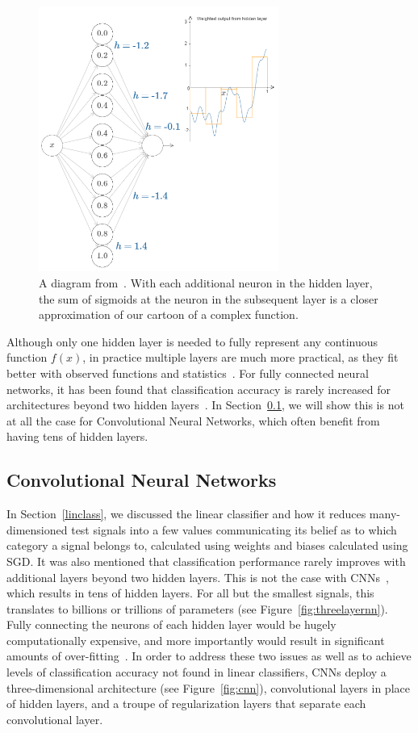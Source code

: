 \begin{figure}[ht!]
	\centering	\includegraphics[width=0.7\textwidth,keepaspectratio]{figs/functionapprox.png}
    \caption{A diagram from~\cite{universalapproxarticle}. With each additional neuron in the hidden layer, the sum of sigmoids at the neuron in the subsequent layer is a closer approximation of our cartoon of a complex function.}
\label{fig:functionapprox}      
\end{figure}

Although only one hidden layer is needed to fully represent any continuous function $f(x)$, in practice multiple layers are much more practical, as they fit better with observed functions and statistics~\cite{cs231}. For fully connected neural networks, it has been found that classification accuracy is rarely increased for architectures beyond two hidden layers~\cite{cs231}. In Section~\ref{cnn}, we will show this is not at all the case for Convolutional Neural Networks, which often benefit from having tens of hidden layers.

\subsection{Convolutional Neural Networks}
\label{cnn}
In Section~\ref{linclass}, we discussed the linear classifier and how it reduces many-dimensioned test signals into a few values communicating its belief as to which category a signal belongs to, calculated using weights and biases calculated using SGD. It was also mentioned that classification performance rarely improves with additional layers beyond two hidden layers. This is not the case with CNNs~\cite{cs231}, which results in tens of hidden layers. For all but the smallest signals, this translates to billions or trillions of parameters (see Figure~\ref{fig:threelayernn}). Fully connecting the neurons of each hidden layer would be hugely computationally expensive, and more importantly would result in significant amounts of over-fitting~\cite{cs231}. In order to address these two issues as well as to achieve levels of classification accuracy not found in linear classifiers, CNNs deploy a three-dimensional architecture (see Figure~\ref{fig:cnn}), convolutional layers in place of hidden layers, and a troupe of regularization layers that separate each convolutional layer.


